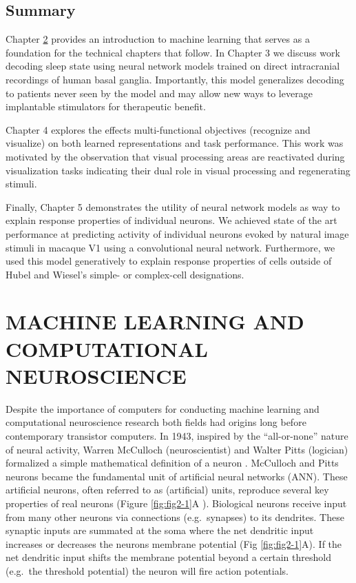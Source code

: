 \documentclass{templates/ucdenverthesis}
\begin{document}
\hypertarget{sec:ch1summary}{%
\section{Summary}\label{sec:ch1summary}}

Chapter \protect\hyperlink{ch:mlprimer}{2} provides an introduction to machine learning that serves as a foundation for the technical chapters that follow.
In Chapter 3 we discuss work decoding sleep state using neural network models trained on direct intracranial recordings of human basal ganglia.
Importantly, this model generalizes decoding to patients never seen by the model and may allow new ways to leverage implantable stimulators for therapeutic benefit.

Chapter 4 explores the effects multi-functional objectives (recognize and visualize) on both learned representations and task performance. This work was motivated by the observation that visual processing areas are reactivated during visualization tasks indicating their dual role in visual processing and regenerating stimuli.

Finally, Chapter 5 demonstrates the utility of neural network models as way to explain response properties of individual neurons. We achieved state of the art performance at predicting activity of individual neurons evoked by natural image stimuli in macaque V1 using a convolutional neural network. Furthermore, we used this model generatively to explain response properties of cells outside of Hubel and Wiesel's simple- or complex-cell designations.

\hypertarget{ch:mlprimer}{%
\chapter{MACHINE LEARNING AND COMPUTATIONAL NEUROSCIENCE}\label{ch:mlprimer}}

Despite the importance of computers for conducting machine learning and computational neuroscience research both fields had origins long before contemporary transistor computers. In 1943, inspired by the ``all-or-none'' nature of neural activity, Warren McCulloch (neuroscientist) and Walter Pitts (logician) formalized a simple mathematical definition of a neuron \autocite{McCulloch:1943vq}.
McCulloch and Pitts neurons became the fundamental unit of artificial neural networks (ANN). These artificial neurons, often referred to as (artificial) units, reproduce several key properties of real neurons (Figure \ref{fig:fig2-1}A ). Biological neurons receive input from many other neurons via connections (e.g.~synapses) to its dendrites. These synaptic inputs are summated at the soma where the net dendritic input increases or decreases the neurons membrane potential (Fig \ref{fig:fig2-1}A). If the net dendritic input shifts the membrane potential beyond a certain threshold (e.g.~the threshold potential) the neuron will fire action potentials.
\end{document}
